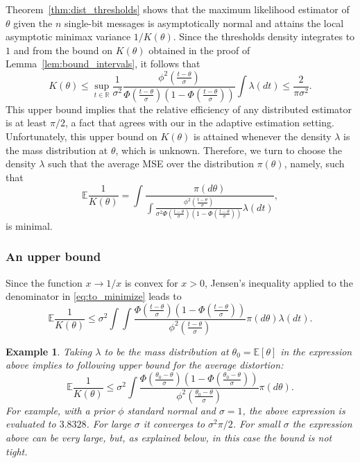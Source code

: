 \documentclass[letterpaper, conference]{IEEEtran}      %
\newtheorem{example}{\bf {Example}}
\begin{document}
Theorem~\ref{thm:dist_thresholds} shows that the maximum likelihood estimator of $\theta$ given the $n$ single-bit messages is asymptotically normal and attains the local asymptotic minimax variance $1/K(\theta)$. Since the thresholds density integrates to $1$ and from the bound on $K(\theta)$ obtained in the proof of Lemma~\ref{lem:bound_intervals}, it follows that
\[
K(\theta) \leq  \sup_{t\in \mathbb R}  \frac{1}{\sigma^2} \frac{\phi^2\left( \frac{t-\theta}{\sigma} \right)} {\Phi \left( \frac{t - \theta}{\sigma} \right)\left(1-\Phi \left(\frac{ t - \theta}{\sigma }\right) \right) }  \int  \lambda(dt)  \leq \frac{2}{\pi \sigma^2}.
\]
This upper bound implies that the relative efficiency of any distributed estimator is at least $\pi/2$, a fact that agrees with our in the adaptive estimation setting. Unfortunately, this upper bound on $K(\theta)$ is attained whenever the density $\lambda$ is the mass distribution at $\theta$, which is unknown. Therefore, we turn to choose the density $\lambda$ such that the average MSE over the distribution $\pi(\theta)$, namely, such that 
\begin{equation} \label{eq:to_minimize}
\mathbb E \frac{1}{K(\theta)} = \int \frac{ \pi(d\theta) }{ \int \frac{ \phi^2 \left(\frac{t-\theta}{\sigma}\right)  } { \sigma^2 \Phi \left(\frac{t-\theta}{\sigma}\right) \left(1 - \Phi \left(\frac{t-\theta}{\sigma}\right) \right)} \lambda(dt) },
\end{equation}
is minimal. 

\subsubsection{An upper bound} 
Since the function $x\rightarrow 1/x$ is convex for $x>0$, Jensen's inequality applied to the denominator in \eqref{eq:to_minimize} leads to
\[
\mathbb E \frac{1}{K(\theta)} \leq  \sigma^2 \int \int  \frac{ { \Phi \left(\frac{t-\theta}{\sigma}\right) \left(1 - \Phi \left(\frac{t-\theta}{\sigma}\right) \right)}  }{  \phi^2 \left(\frac{t-\theta}{\sigma}\right) }  \pi(d\theta) \lambda(dt). 
\]

\begin{example}
Taking $\lambda$ to be the mass distribution at $\theta_0 = \mathbb E[\theta]$ in the expression above implies to following upper bound for the average distortion: 
\begin{equation} \label{eq:dist_upper bound}
\mathbb E \frac{1}{K(\theta)} \leq \sigma^2 \int   \frac{ { \Phi \left(\frac{\theta_0-\theta}{\sigma}\right) \left(1 - \Phi \left(\frac{\theta_0-\theta}{\sigma}\right) \right)}  }{  \phi^2 \left(\frac{\theta_0-\theta}{\sigma}\right) }  \pi(d\theta). 
\end{equation}
For example, with a prior $\phi$ standard normal and $\sigma=1$, the above expression is evaluated to $3.8328$. For large $\sigma$ it converges to $\sigma^2 \pi/2$. For small $\sigma$ the expression above can be very large, but, as explained below, in this case the bound is not tight. 
\end{example}
\end{document}

